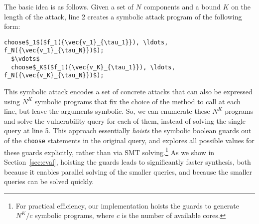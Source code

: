 The basic idea is as follows. Given a set of $N$ components and a bound $K$ on 
the length of the attack, line 2 creates a symbolic attack program of the
following form:
\begin{lstlisting}[numbers=none,frame=none,basicstyle=\footnotesize\ttfamily]
  choose$_1$($f_1({\vec{v_1}_{\tau_1}}), \ldots, f_N({\vec{v_1}_{\tau_N}})$);  
  $\vdots$
  choose$_K$($f_1({\vec{v_K}_{\tau_1}}), \ldots, f_N({\vec{v_K}_{\tau_N}})$);   
\end{lstlisting}
This symbolic attack encodes a set of concrete attacks that can also be
expressed using $N^K$ symbolic programs that fix the choice of the method to
call at each line, but leave the arguments symbolic. So, we can enumerate these
$N^K$ programs and solve the vulnerability query for each of them, instead of
solving the single query at line 5. This approach essentially \emph{hoists} the
symbolic boolean guards out of the \texttt{choose} statements in the original query, and
\toolname explores all possible values for these guards explicitly, rather than
via SMT solving.\footnote{For practical efficiency, our implementation hoists 
the guards to generate $N^K/c$ symbolic programs, where $c$ is  
the number of available cores.} 
As we show in Section~\ref{sec:eval},
hoisting the guards leads to significantly faster synthesis, 
both because it enables parallel solving of the smaller queries, and 
because the smaller queries can be solved quickly.





